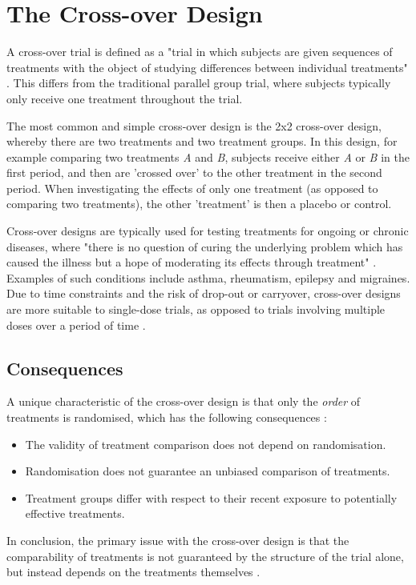 \documentclass[12pt, TexShade, letterpaper]{report}
\begin{document}
\section{The Cross-over Design}
A cross-over trial is defined as a "trial in which subjects are given sequences of treatments with the object of studying differences between individual treatments" \cite{senn2002crossover}. This differs from the traditional parallel group trial, where subjects typically only receive one treatment throughout the trial.

The most common and simple cross-over design is the 2x2 cross-over design, whereby there are two treatments and two treatment groups. In this design, for example comparing two treatments \textit{A} and \textit{B}, subjects receive either \textit{A} or \textit{B} in the first period, and then are 'crossed over' to the other treatment in the second period. When investigating the effects of only one treatment (as opposed to comparing two treatments), the other 'treatment' is then a placebo or control.

Cross-over designs are typically used for testing treatments for ongoing or chronic diseases, where "there is no question of curing the underlying problem which has caused the illness but a hope of moderating its effects through treatment" \cite{senn2002crossover}. Examples of such conditions include asthma, rheumatism, epilepsy and migraines. Due to time constraints and the risk of drop-out or carryover, cross-over designs are more suitable to single-dose trials, as opposed to trials involving multiple doses over a period of time \cite{senn2002crossover}.

\subsection{Consequences}
A unique characteristic of the cross-over design is that only the \textit{order} of treatments is randomised, which has the following consequences \cite{piantadosi2005clinical}:
\begin{itemize}
    \item The validity of treatment comparison does not depend on randomisation.
    \item Randomisation does not guarantee an unbiased comparison of treatments.
    \item Treatment groups differ with respect to their recent exposure to potentially effective treatments.
\end{itemize}
In conclusion, the primary issue with the cross-over design is that the comparability of treatments is not guaranteed by the structure of the trial alone, but instead depends on the treatments themselves \cite{piantadosi2005clinical}.
\end{document}
